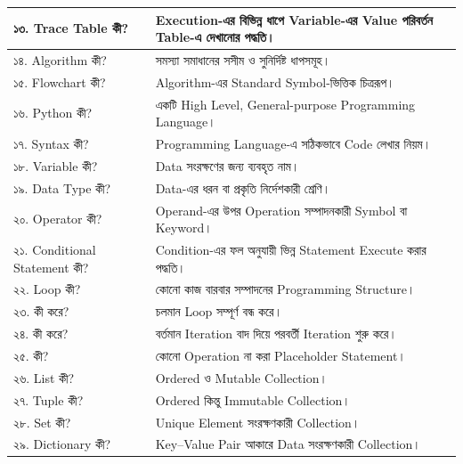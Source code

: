 \begin{longtable}{
|L{0.33\textwidth}
|L{0.59\textwidth}|
}
১৩. Trace Table কী?
&
Execution-এর বিভিন্ন ধাপে Variable-এর Value পরিবর্তন Table-এ দেখানোর পদ্ধতি।
\\
\hline

১৪. Algorithm কী?
&
সমস্যা সমাধানের সসীম ও সুনির্দিষ্ট ধাপসমূহ।
\\
\hline

১৫. Flowchart কী?
&
Algorithm-এর Standard Symbol-ভিত্তিক চিত্ররূপ।
\\
\hline

১৬. Python কী?
&
একটি High Level, General-purpose Programming Language।
\\
\hline

১৭. Syntax কী?
&
Programming Language-এ সঠিকভাবে Code লেখার নিয়ম।
\\
\hline

১৮. Variable কী?
&
Data সংরক্ষণের জন্য ব্যবহৃত নাম।
\\
\hline

১৯. Data Type কী?
&
Data-এর ধরন বা প্রকৃতি নির্দেশকারী শ্রেণি।
\\
\hline

২০. Operator কী?
&
Operand-এর উপর Operation সম্পাদনকারী Symbol বা Keyword।
\\
\hline

২১. Conditional Statement কী?
&
Condition-এর ফল অনুযায়ী ভিন্ন Statement Execute করার পদ্ধতি।
\\
\hline

২২. Loop কী?
&
কোনো কাজ বারবার সম্পাদনের Programming Structure।
\\
\hline

২৩.  কী করে?
&
চলমান Loop সম্পূর্ণ বন্ধ করে।
\\
\hline

২৪.  কী করে?
&
বর্তমান Iteration বাদ দিয়ে পরবর্তী Iteration শুরু করে।
\\
\hline

২৫.  কী?
&
কোনো Operation না করা Placeholder Statement।
\\
\hline

২৬. List কী?
&
Ordered ও Mutable Collection।
\\
\hline

২৭. Tuple কী?
&
Ordered কিন্তু Immutable Collection।
\\
\hline

২৮. Set কী?
&
Unique Element সংরক্ষণকারী Collection।
\\
\hline

২৯. Dictionary কী?
&
Key--Value Pair আকারে Data সংরক্ষণকারী Collection।
\\
\hline


\end{longtable}
